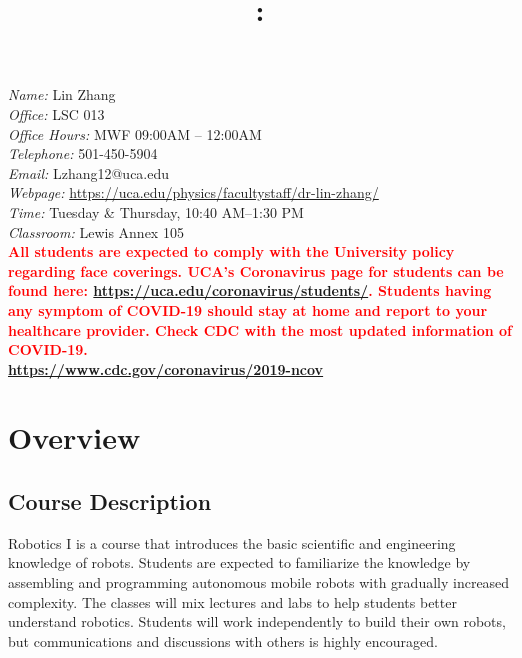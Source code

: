 \documentclass[11pt,letterpaper]{article}
\title{\Large\bfseries \coursecode: \coursetitle \\[0.1cm] \semester}
\author{}
\date{}
\makeatletter
\newcommand{\lefthead}[2]{\noindent{\large\textbf{#1}\hfill\\[#2]}}
\newcommand{\instructor}{Lin Zhang}
\newcommand{\office}{LSC 013}
\newcommand{\email}{Lzhang12@uca.edu}
\newcommand{\officehours}{MWF 09:00AM -- 12:00AM}
\newcommand{\classroom}{Lewis Annex 105}
\newcommand{\classtime}{Tuesday \& Thursday, 10:40 AM--1:30 PM}
\newcommand{\telephone}{501-450-5904}
\newcommand{\webpage}{\href{https://uca.edu/physics/facultystaff/dr-lin-zhang/}{https://uca.edu/physics/facultystaff/dr-lin-zhang/}}
\makeatother
\begin{document}
\maketitle
\thispagestyle{empty}
\vspace{-2cm}


\lefthead{Instructor}{0.3cm}
\indent \emph{Name:} \instructor \\
\indent \emph{Office:} \office \hspace{.5cm}{\footnotesize I may also appear in LSCA 105 or CCCS 112} \\
\indent \emph{Office Hours:} \officehours \\
\indent \emph{Telephone:} \telephone \\
\indent \emph{Email:} \email \\
\indent \emph{Webpage:} \webpage \\

\lefthead{Class \& Lab}{0.3cm}
\indent \emph{Time:} \classtime \\
\indent \emph{Classroom:} \classroom \\[0.3cm]


\noindent \textbf{\textcolor{red}{All students are expected to comply with the University policy regarding face coverings. UCA’s Coronavirus page for students can be found here: \href{https://uca.edu/coronavirus/students/}{https://uca.edu/coronavirus/students/}. Students having any symptom of COVID-19 should stay at home and report to your healthcare provider. Check CDC with the most updated information of COVID-19. \\\href{https://www.cdc.gov/coronavirus/2019-ncov}{https://www.cdc.gov/coronavirus/2019-ncov}}} 

\section*{Overview}
\subsection*{Course Description}
Robotics I is a course that introduces the basic scientific and engineering knowledge of robots. Students are expected to familiarize the knowledge by assembling and programming autonomous mobile robots with gradually increased complexity. The classes will mix lectures and labs to help students better understand robotics. Students will work independently to build their own robots, but communications and discussions with others is highly encouraged. 
\end{document}
